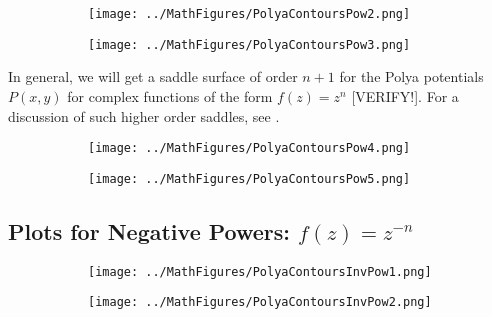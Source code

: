 \documentclass[12pt]{article}
\begin{document}
\begin{figure}[h]
\caption{Polya potential contours of $f(z) = z^2$ and $f(z) = z^3$}	
\label{Fig:ContoursPow_2_3}	
\centering
\begin{subfigure}[b]{0.49\textwidth}
\centering
\texttt{[image: ../MathFigures/PolyaContoursPow2.png]}
\end{subfigure}
\begin{subfigure}[b]{0.49\textwidth}
\centering
\texttt{[image: ../MathFigures/PolyaContoursPow3.png]}
\end{subfigure}
\end{figure}

In general, we will get a saddle surface of order $n+1$ for the Polya potentials $P(x,y)$ for complex functions of the form $f(z) = z^n$ [VERIFY!]. For a discussion of such higher order saddles, see \cite{HighOrderSaddles}.

\begin{figure}[h]
\caption{Polya potential contours of $f(z) = z^4$ and $f(z) = z^5$}	
\label{Fig:ContoursPow_4_5}	
\centering
\begin{subfigure}[b]{0.49\textwidth}
\centering
\texttt{[image: ../MathFigures/PolyaContoursPow4.png]}
\end{subfigure}
\begin{subfigure}[b]{0.49\textwidth}
\centering
\texttt{[image: ../MathFigures/PolyaContoursPow5.png]}
\end{subfigure}
\end{figure}





\subsection{Plots for Negative Powers: $f(z) = z^{-n}$}

\begin{figure}[h]
\caption{Polya potential contours of $f(z) = 1/z$ and $f(z) = 1/z^2$}	
\label{Fig:ContoursInvPow_1_2}	
\centering
\begin{subfigure}[b]{0.49\textwidth}
\centering
\texttt{[image: ../MathFigures/PolyaContoursInvPow1.png]}
\end{subfigure}
\begin{subfigure}[b]{0.49\textwidth}
\centering
\texttt{[image: ../MathFigures/PolyaContoursInvPow2.png]}
\end{subfigure}
\end{figure}
\end{document}
